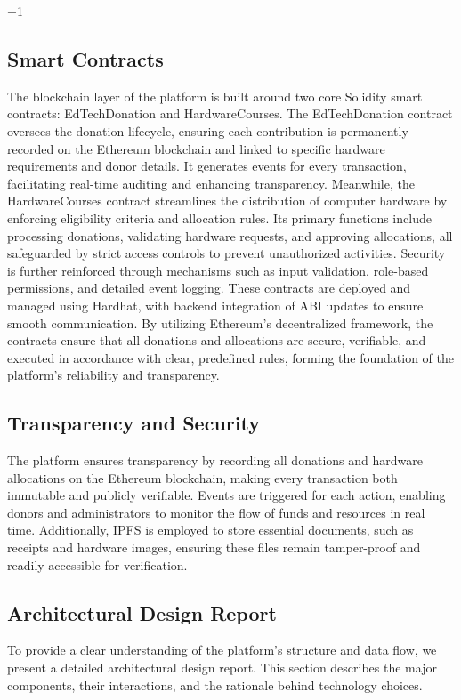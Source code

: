 +1\documentclass[conference]{IEEEtran}
\begin{document}
\subsection{Smart Contracts}
The blockchain layer of the platform is built around two core Solidity smart contracts: EdTechDonation and HardwareCourses. The EdTechDonation contract oversees the donation lifecycle, ensuring each contribution is permanently recorded on the Ethereum blockchain and linked to specific hardware requirements and donor details. It generates events for every transaction, facilitating real-time auditing and enhancing transparency. Meanwhile, the HardwareCourses contract streamlines the distribution of computer hardware by enforcing eligibility criteria and allocation rules. Its primary functions include processing donations, validating hardware requests, and approving allocations, all safeguarded by strict access controls to prevent unauthorized activities. Security is further reinforced through mechanisms such as input validation, role-based permissions, and detailed event logging. These contracts are deployed and managed using Hardhat, with backend integration of ABI updates to ensure smooth communication. By utilizing Ethereum’s decentralized framework, the contracts ensure that all donations and allocations are secure, verifiable, and executed in accordance with clear, predefined rules, forming the foundation of the platform’s reliability and transparency.

\subsection{Transparency and Security}
The platform ensures transparency by recording all donations and hardware allocations on the Ethereum blockchain, making every transaction both immutable and publicly verifiable. Events are triggered for each action, enabling donors and administrators to monitor the flow of funds and resources in real time. Additionally, IPFS is employed to store essential documents, such as receipts and hardware images, ensuring these files remain tamper-proof and readily accessible for verification.

\subsection{Architectural Design Report}
To provide a clear understanding of the platform’s structure and data flow, we present a detailed architectural design report. This section describes the major components, their interactions, and the rationale behind technology choices.
\end{document}
